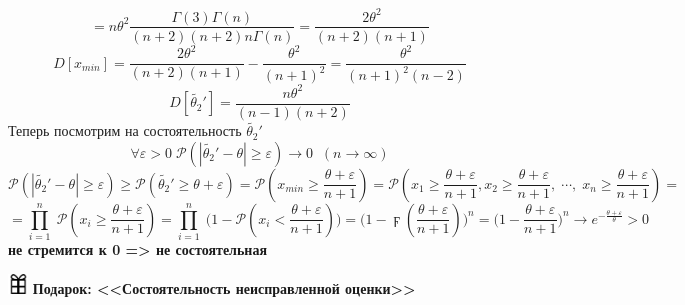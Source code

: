 \vspace{1.5 mm}
\begin{equation*}
    = n\theta^2\frac{\Gamma(3)\Gamma(n)}{(n+2)(n+2)n\Gamma(n)} = \frac{2\theta^2}{(n+2)(n+1)}
\end{equation*}
\vspace{1.5 mm}
\begin{equation*}
    D\left[x_{min} \right] = \frac{2\theta^2}{(n+2)(n+1)} - \frac{\theta^2}{(n+1)^2} = \frac{\theta^2}{(n+1)^2(n-2)}
\end{equation*}
\vspace{1.5 mm}
\begin{equation*}
    D\left[\tilde{\theta_2}' \right]  = \frac{n\theta^2}{(n-1)(n+2)}
\end{equation*}
\vspace{1.5 mm}
Теперь посмотрим на состоятельность $\tilde{\theta_2}'$
\begin{equation*}
    \forall\varepsilon > 0 \; \mathcal{P}\left(|\tilde{\theta_2}' - \theta| \geqslant \varepsilon\right) \to 0\;\;(n\to\infty)
\end{equation*}
\vspace{1.5 mm}
\begin{equation*}
    \mathcal{P}\left(|\tilde{\theta_2}' - \theta| \geqslant \varepsilon\right) \geqslant \mathcal{P}\left(\tilde{\theta_2}' \geqslant \theta+\varepsilon\right)
    =  \mathcal{P}\left(x_{min}\geqslant \frac{\theta+\varepsilon}{n+1}\right) 
    =  \mathcal{P}\left(x_{1}\geqslant \frac{\theta+\varepsilon}{n+1}, x_{2}\geqslant \frac{\theta+\varepsilon}{n+1}, \;\dotsi,\; x_{n}\geqslant \frac{\theta+\varepsilon}{n+1} \right)
    =
\end{equation*}
\vspace{1.5 mm}
\begin{equation*}
    = \prod\limits_{i=1}^n\;\mathcal{P}\left(x_{i}\geqslant \frac{\theta+\varepsilon}{n+1}\right) 
    = \prod\limits_{i=1}^n\;\Bigg(1 - \mathcal{P}\left(x_{i} < \frac{\theta+\varepsilon}{n+1}\right)\Bigg)
    = \Bigg(1 - \digamma\left(\frac{\theta+\varepsilon}{n+1}\right)\Bigg)^n
    = \Bigg(1 - \frac{\theta+\varepsilon}{n+1}\Bigg)^n
    \to e^{-\frac{\theta+\varepsilon}{\theta}} > 0  
\end{equation*} 
\vspace{1.5mm}
\textbf{не стремится к 0 => не состоятельная}
\vspace{1.5mm}\\
\begin{flushleft}
    \includegraphics[width=0.04\textwidth]{images/present.png} 
    \textbf{Подарок: <<Состоятельность неисправленной оценки>>}
\end{flushleft}
